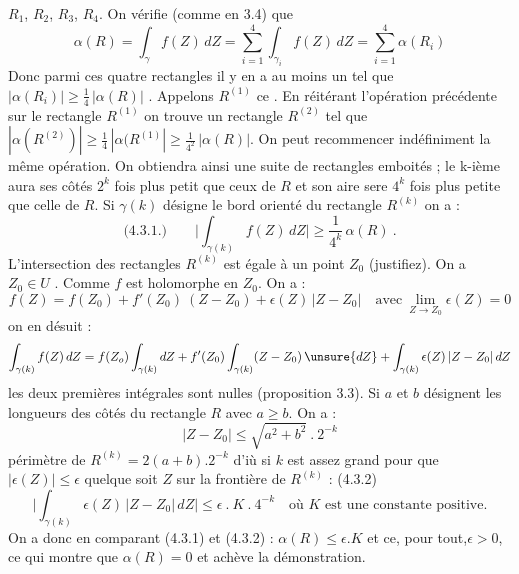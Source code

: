 
$R_1$, $R_2$, $R_3$, $R_4$. On vérifie (comme en 3.4) que
\[ \alpha(R) = \int_\gamma f(Z)\, dZ = \sum_{i=1}^{4} \int_{\gamma_i} f(Z)\, dZ = \sum_{i=1}^{4} \alpha(R_i) \]
Donc parmi ces quatre rectangles il y en a au moins un tel que
$|\alpha(R_i)| \geq \frac{1}{4}\, |\alpha(R)|$ . Appelons $R^{(1)}$ ce .
En réitérant l'opération précédente sur le rectangle $R^{(1)}$ on trouve un
rectangle $R^{(2)}$ tel que $|\alpha(R^{(2)})| \geq \frac{1}{4}\, |\alpha(R^{(1)}| \geq \frac{1}{4^2}\, |\alpha(R)|$.
On peut recommencer indéfiniment la même opération. On obtiendra ainsi une suite
de rectangles emboités ; le k-ième aura ses côtés $2^k$ fois plus petit que ceux
de $R$ et son aire sere $4^k$ fois plus petite que celle de $R$.
Si $\gamma(k)$ désigne le bord orienté du rectangle $R^{(k)}$ on a :
\[ \text{(4.3.1.)} \qquad \Big|\int_{\gamma(k)} f(Z)\, dZ\Big| \geq \frac{1}{4^k}\, \alpha(R) \ . \]
L'intersection des rectangles $R^{(k)}$ est égale à un point $Z_0$
(justifiez). On a $Z_0 \in U$ . Comme $f$ est holomorphe en $Z_0$. On a :
\[ f(Z) = f(Z_0) + f'(Z_0)\ (Z-Z_0) + \epsilon(Z)\, |Z-Z_0| \quad \text{avec} \ \lim_{Z \to Z_0} \epsilon(Z) = 0 \]
on en désuit :
\[ \int_{\gamma(k)} f(Z)\, dZ = f(Z_o) \int_{\gamma(k)} dZ + f'(Z_0) \int_{\gamma(k)} (Z-Z_0)\, \unsure{dZ} + \int_{\gamma(k)} \epsilon(Z)\, |Z-Z_0|\, dZ \]
les deux premières intégrales sont nulles (proposition 3.3). Si $a$ et $b$ désignent
les longueurs des côtés du rectangle $R$ avec $a \geq b$. On a :
\[ |Z-Z_0| \leq \sqrt{a^2+b^2}\ .\ 2^{-k} \]
périmètre de $R^{(k)} = 2(a+b).2^{-k}$ d'iù si $k$ est assez grand pour que $|\epsilon(Z)| \leq \epsilon$
quelque soit $Z$ sur la frontière de $R^{(k)}$ :
(4.3.2)
\[ \Big|\int_{\gamma(k)} \epsilon(Z)\, |Z-Z_0|\, dZ\Big| \leq \epsilon\ .\ K\ .\ 4^{-k} \quad \text{où $K$ est une constante positive.} \]
On a donc en comparant (4.3.1) et (4.3.2) :
$\alpha(R) \leq \epsilon.K$ et ce, pour tout,$\epsilon > 0$, ce qui montre que $\alpha(R) = 0$ et
achève la démonstration.

